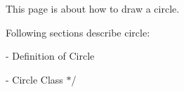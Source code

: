 
\begin{DoxyItemize}
\item 
\item This page is about how to draw a circle.
\item Following sections describe circle\+:
\item -\/ Definition of Circle
\item -\/ Circle Class $\ast$/ 
\end{DoxyItemize}